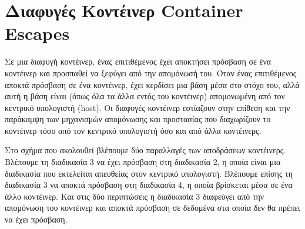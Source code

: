 \section{Διαφυγές Κοντέινερ \textlatin{Container Escapes}}

Σε μια διαφυγή κοντέινερ, ένας επιτιθέμενος έχει αποκτήσει πρόσβαση σε ένα
κοντέινερ και προσπαθεί να ξεφύγει από την απομόνωσή του. Όταν ένας επιτιθέμενος
αποκτά πρόσβαση σε ένα κοντέινερ, έχει κερδίσει μια βάση μέσα στο στόχο του,
αλλά αυτή η βάση είναι (όπως όλα τα άλλα εντός του κοντέινερ) απομονωμένη από
τον κεντρικό υπολογιστή (\textlatin{host}). Οι διαφυγές κοντέινερ εστίαζουν
στην επίθεση και την παράκαμψη των μηχανισμών απομόνωσης και προστασίας που
διαχωρίζουν το κοντέινερ τόσο από τον κεντρικό υπολογιστή όσο και από άλλα
κοντέινερς.

Στο σχήμα που ακολουθεί βλέπουμε δύο παραλλαγές των αποδράσεων κοντέινερς.
Βλέπουμε τη διαδικασία 3 να έχει πρόσβαση στη διαδικασία 2, η οποία είναι μια
διαδικασία που εκτελείται απευθείας στον κεντρικό υπολογιστή.
Βλέπουμε επίσης τη διαδικασία 3 να αποκτά πρόσβαση στη διαδικασία 4, η οποία
βρίσκεται μέσα σε ένα άλλο κοντέινερ. Και στις δύο περιπτώσεις η διαδικασία 3
διαφεύγει από την απομόνωση του κοντέινερ και αποκτά πρόσβαση σε δεδομένα στα
οποία δεν θα πρέπει να έχει πρόσβαση.

